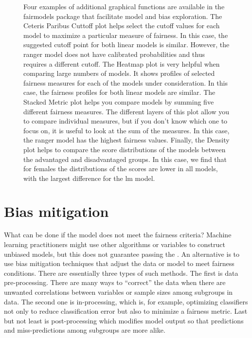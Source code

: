 \begin{figure}
\caption[Four examples of additional graphical functions are available in the fairmodels package that facilitate model and bias exploration]{Four examples of additional graphical functions are available in the fairmodels package that facilitate model and bias exploration. The Ceteris Paribus Cuttoff plot helps select the cutoff values for each model to maximize a particular measure of fairness. In this case, the suggested cutoff point for both linear models is similar. However, the ranger model does not have calibrated probabilities and thus requires a different cutoff. The Heatmap plot is very helpful when comparing large numbers of models. It shows profiles of selected fairness measures for each of the models under consideration. In this case, the fairness profiles for both linear models are similar. The Stacked Metric plot helps you compare models by summing five different fairness measures. The different layers of this plot allow you to compare individual measures, but if you don't know which one to focus on, it is useful to look at the sum of the measures. In this case, the ranger model has the highest fairness values. Finally, the Density plot helps to compare the score distributions of the models between the advantaged and disadvantaged groups. In this case, we find that for females the distributions of the scores are lower in all models, with the largest difference for the lm model. }\label{fig:all}
\end{figure}

\hypertarget{mitigation}{%
\section{Bias mitigation}\label{mitigation}}

What can be done if the model does not meet the fairness criteria?
Machine learning practitioners might use other algorithms or variables
to construct unbiased models, but this does not guarantee passing the
. An alternative is to use bias mitigation
techniques that adjust the data or model to meet fairness conditions.
There are essentially three types of such methods. The first is data
pre-processing. There are many ways to ``correct'' the data when there
are unwanted correlations between variables or sample sizes among
subgroups in data. The second one is in-processing, which is, for
example, optimizing classifiers not only to reduce classification error
but also to minimize a fairness metric. Last but not least is
post-processing which modifies model output so that predictions and
miss-predictions among subgroups are more alike.

